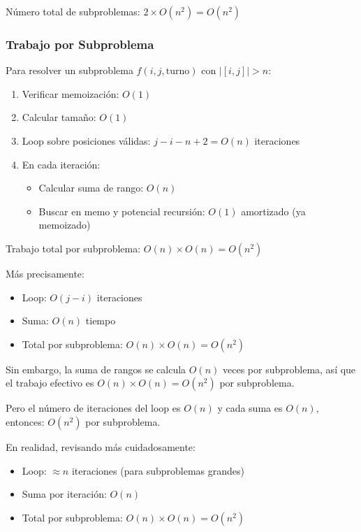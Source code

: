 \documentclass[12pt,letterpaper]{article}
\begin{document}
Número total de subproblemas: $2 \times O(n^2) = O(n^2)$

\subsubsection{Trabajo por Subproblema}

Para resolver un subproblema $f(i, j, \text{turno})$ con $|[i,j]| > n$:

\begin{enumerate}
    \item Verificar memoización: $O(1)$
    \item Calcular tamaño: $O(1)$
    \item Loop sobre posiciones válidas: $j - i - n + 2 = O(n)$ iteraciones
    \item En cada iteración:
    \begin{itemize}
        \item Calcular suma de rango: $O(n)$
        \item Buscar en memo y potencial recursión: $O(1)$ amortizado (ya memoizado)
    \end{itemize}
\end{enumerate}

Trabajo total por subproblema: $O(n) \times O(n) = O(n^2)$

Más precisamente:
\begin{itemize}
    \item Loop: $O(j - i)$ iteraciones
    \item Suma: $O(n)$ tiempo
    \item Total por subproblema: $O(n) \times O(n) = O(n^2)$
\end{itemize}

Sin embargo, la suma de rangos se calcula $O(n)$ veces por subproblema, así que el trabajo efectivo es $O(n) \times O(n) = O(n^2)$ por subproblema.

Pero el número de iteraciones del loop es $O(n)$ y cada suma es $O(n)$, entonces: $O(n^2)$ por subproblema.

En realidad, revisando más cuidadosamente:
\begin{itemize}
    \item Loop: $\approx n$ iteraciones (para subproblemas grandes)
    \item Suma por iteración: $O(n)$
    \item Total por subproblema: $O(n) \times O(n) = O(n^2)$
\end{itemize}
\end{document}
